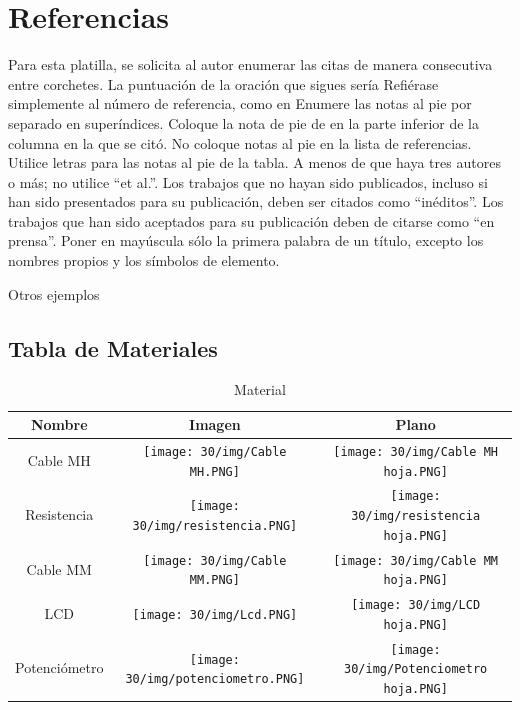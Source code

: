         \section*{Referencias}
    
        Para esta platilla, se solicita al autor enumerar las citas de manera consecutiva entre corchetes. 
        La puntuación de la oración que sigues sería %
        Refiérase simplemente al número de referencia, como en %
        Enumere las notas al pie por separado en superíndices. Coloque la nota de pie de en la parte inferior de la columna en la que se citó. No coloque notas al pie en la lista de referencias. Utilice letras para las notas al pie de la tabla.
        A menos de que haya tres autores o más; no utilice “et al.”. Los trabajos que no hayan sido publicados, incluso si han sido presentados para su publicación, deben ser citados como “inéditos”. Los trabajos que han sido aceptados para su publicación deben de citarse como “en prensa”. Poner en mayúscula sólo la primera palabra de un título, excepto los nombres propios y los símbolos de elemento. 
    
        Otros ejemplos %
    
    \subsection{Tabla de Materiales}
    \begin{table}[H]
        \centering
        \begin{tabular}{|c|c|c|}
        \hline
        Nombre & Imagen & Plano \\
        \hline
        Cable MH & \texttt{[image: 30/img/Cable MH.PNG]} & \texttt{[image: 30/img/Cable MH hoja.PNG]} \\
        \hline
        Resistencia & \texttt{[image: 30/img/resistencia.PNG]} & \texttt{[image: 30/img/resistencia hoja.PNG]} \\
        \hline
        Cable MM & \texttt{[image: 30/img/Cable MM.PNG]} & \texttt{[image: 30/img/Cable MM hoja.PNG]} \\
        \hline
        LCD & \texttt{[image: 30/img/Lcd.PNG]} & \texttt{[image: 30/img/LCD hoja.PNG]} \\
        \hline
        Potenciómetro & \texttt{[image: 30/img/potenciometro.PNG]} & \texttt{[image: 30/img/Potenciometro hoja.PNG]} \\
        \hline
        \end{tabular}
        \caption{Material}
        \label{tab:my_label}
    \end{table}
    
